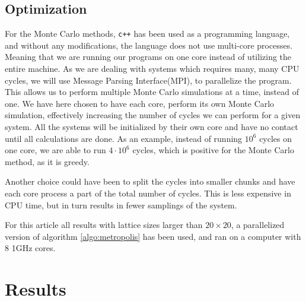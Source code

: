 \documentclass[%
reprint,
nofootinbib,
amsmath,amssymb,
aps,
]{revtex4-1}
\begin{document}
\subsection{Optimization}%
For the Monte Carlo methods, \texttt{c++} has been used as a programming language, and without any modifications, the language does not use multi-core processes. Meaning that we are running our programs on one core instead of utilizing the entire machine. As we are dealing with systems which requires many, many CPU cycles, we will use Message Parsing Interface(MPI), to parallelize the program. This allows us to perform multiple Monte Carlo simulations at a time, instead of one. We have here chosen to have each core, perform its own Monte Carlo simulation, effectively increasing the number of cycles we can perform for a given system. All the systems will be initialized by their own core and have no contact until all calculations are done. As an example, instead of running $10^6$ cycles on one core, we are able to run $4\cdot 10^6$ cycles, which is positive for the Monte Carlo method, as it is greedy. 

Another choice could have been to split the cycles into smaller chunks and have each core process a part of the total number of cycles. This is less expensive in CPU time, but in turn results in fewer samplings of the system.  

For this article all results with lattice sizes larger than $20\times20$, a parallelized version of algorithm \ref{algo:metropolis} has been used, and ran on a computer with 8 1GHz cores. 
\section{Results}%
\end{document}
